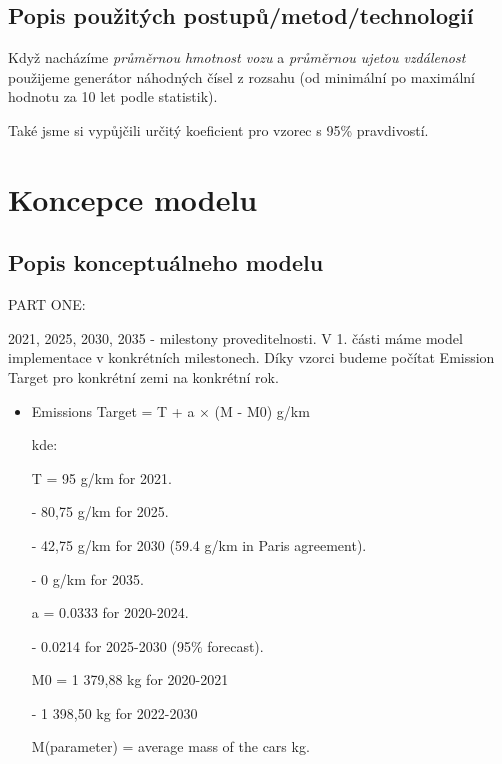 \documentclass[a4paper, 11pt]{article}
\begin{document}
	\subsection{Popis použitých postupů/metod/technologií}
	Když nacházíme \textit{průměrnou hmotnost vozu} a \textit{průměrnou ujetou vzdálenost} použijeme generátor náhodných čísel z rozsahu (od minimální po maximální hodnotu za 10 let podle statistik).
	
	Také jsme si vypůjčili určitý koeficient pro vzorec s 95\% pravdivostí.

	\vspace*{14mm}
	\section{Koncepce modelu}

	\subsection{Popis konceptuálneho modelu}
	PART ONE:
    
    \vspace*{3mm}2021, 2025, 2030, 2035 - milestony proveditelnosti. V 1. části máme model implementace v konkrétních milestonech.
    Díky vzorci budeme počítat Emission Target pro konkrétní zemi na konkrétní rok. 
    
    \vspace*{3mm}
    
    \begin{itemize}
    \item Emissions Target = T + a × (M - M0) g/km
    
    kde:
    \vspace*{2mm}

	T = 95 g/km for 2021. 
	
	- 80,75 g/km for 2025. 
	
	- 42,75 g/km for 2030 (59.4 g/km in Paris agreement).
	
	- 0 g/km for 2035.
	
	\vspace*{2mm}
	
    a = 0.0333 for 2020-2024. 
    
    - 0.0214 for 2025-2030 (95\% forecast).
    
    \vspace*{2mm}
    
    M0 = 1 379,88 kg for 2020-2021
    
    - 1 398,50 kg for 2022-2030
    
    \vspace*{2mm}
    
    M(parameter) = average mass of the cars kg.
    \end{itemize}
    
\end{document}
